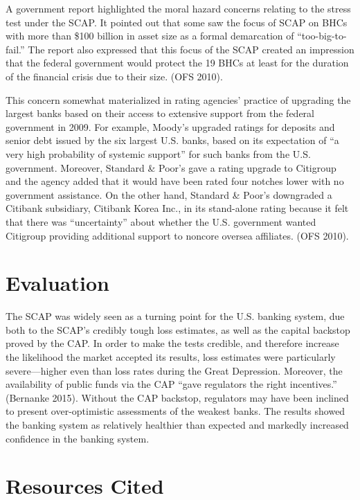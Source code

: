\documentclass[justified, nobib]{tufte-handout2}
\begin{document}
A government report highlighted the moral hazard concerns relating to
the stress test under the SCAP. It pointed out that some saw the focus
of SCAP on BHCs with more than \$100 billion in asset size as a formal
demarcation of ``too-big-to-fail.'' The report also expressed that this
focus of the SCAP created an impression that the federal government
would protect the 19 BHCs at least for the duration of the financial
crisis due to their size. (OFS 2010).

This concern somewhat materialized in rating agencies' practice of
upgrading the largest banks based on their access to extensive support
from the federal government in 2009. For example, Moody's upgraded
ratings for deposits and senior debt issued by the six largest U.S.
banks, based on its expectation of ``a very high probability of systemic
support'' for such banks from the U.S. government. Moreover, Standard \&
Poor's gave a rating upgrade to Citigroup and the agency added that it
would have been rated four notches lower with no government assistance.
On the other hand, Standard \& Poor's downgraded a Citibank subsidiary,
Citibank Korea Inc., in its stand-alone rating because it felt that
there was ``uncertainty'' about whether the U.S. government wanted
Citigroup providing additional support to noncore oversea affiliates.
(OFS 2010).

\section{Evaluation}

The SCAP was widely seen as a turning point for the U.S. banking system,
due both to the SCAP's credibly tough loss estimates, as well as the
capital backstop proved by the CAP. In order to make the tests credible,
and therefore increase the likelihood the market accepted its results,
loss estimates were particularly severe---higher even than loss rates
during the Great Depression. Moreover, the availability of public funds
via the CAP ``gave regulators the right incentives.'' (Bernanke 2015).
Without the CAP backstop, regulators may have been inclined to present
over-optimistic assessments of the weakest banks. The results showed the
banking system as relatively healthier than expected and markedly
increased confidence in the banking system.

\section{Resources Cited}
\end{document}
